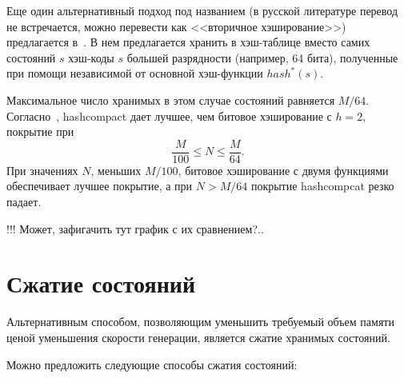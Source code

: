 Еще один альтернативный подход под названием  (в русской литературе
перевод не встречается, можно перевести как <<вторичное хэширование>>) предлагается
в~\cite{Wolper}. В нем предлагается хранить в хэш-таблице вместо самих состояний $s$
хэш-коды $s$ большей разрядности (например, 64 бита), полученные при помощи независимой от
основной хэш-функции $hash^*(s)$.

Максимальное число хранимых в этом случае состояний равняется
$M/64$. Согласно~\cite{BitHash1}, hashcompact дает лучшее, чем битовое хэширование с $h =
2$, покрытие при
\begin{equation}
  \label{eq:hashcompcat-coverage-optima}
  \frac{M}{100} \leq N \leq \frac{M}{64}.
\end{equation}
При значениях $N$, меньших $M/100$, битовое хэширование с двумя функциями обеспечивает
лучшее покрытие, а при $N > M/64$ покрытие hashcompcat резко падает.~\cite{Wolper}

!!! Может, зафигачить тут график с их сравнением?..

\section{Сжатие состояний}
\label{sec:state-compression}


Альтернативным способом, позволяющим уменьшить требуемый объем памяти ценой уменьшения
скорости генерации, является сжатие хранимых состояний.

Можно предложить следующие способы сжатия состояний:

